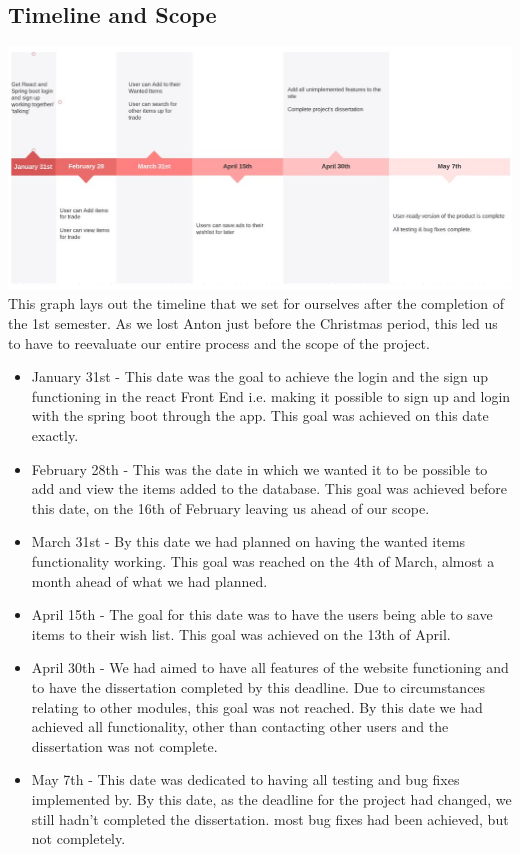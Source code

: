 \subsection{Timeline and Scope}
\includegraphics[scale=0.4]{img/timeline.png}
This graph lays out the timeline that we set for ourselves after the completion of the 1st semester. As we lost Anton just before the Christmas period, this led us to have to reevaluate our entire process and the scope of the project. 
\begin{itemize}
    \item January 31st - This date was the goal to achieve the login and the sign up functioning in the react Front End i.e. making it possible to sign up and login with the spring boot through the app. This goal was achieved on this date exactly.
    \item February 28th - This was the date in which we wanted it to be possible to add and view the items added to the database. This goal was achieved before this date, on the 16th of February leaving us ahead of our scope.
    \item March 31st - By this date we had planned on having the wanted items functionality working. This goal was reached on the 4th of March, almost a month ahead of what we had planned.
    \item April 15th - The goal for this date was to have the users being able to save items to their wish list. This goal was achieved on the 13th of April.
    \item April 30th - We had aimed to have all features of the website functioning and to have the dissertation completed by this deadline. Due to circumstances relating to other modules, this goal was not reached. By this date we had achieved all functionality, other than contacting other users and the dissertation was not complete.
    \item May 7th - This date was dedicated to having all testing and bug fixes implemented by. By this date, as the deadline for the project had changed, we still hadn't completed the dissertation. most bug fixes had been achieved, but not completely.
\end{itemize}
